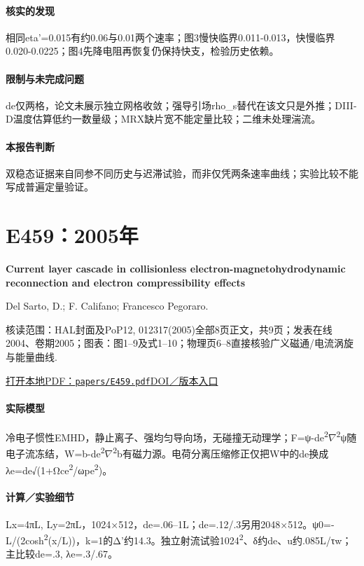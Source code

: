 \paragraph{核实的发现}相同eta'=0.015有约0.06与0.01两个速率；图3慢快临界0.011-0.013，快慢临界0.020-0.0225；图4先降电阻再恢复仍保持快支，检验历史依赖。

\paragraph{限制与未完成问题}de仅两格，论文未展示独立网格收敛；强导引场rho\_s替代在该文只是外推；DIII-D温度估算低约一数量级；MRX缺片宽不能定量比较；二维未处理湍流。

\paragraph{本报告判断}双稳态证据来自同参不同历史与迟滞试验，而非仅凭两条速率曲线；实验比较不能写成普遍定量验证。

\section{E459：2005年}\label{paper:E459}

\textbf{Current layer cascade in collisionless electron-magnetohydrodynamic reconnection and electron compressibility effects}\citep{E459}\

Del Sarto,  D.;  F. Califano;  Francesco Pegoraro.

\textsf{核读范围：}HAL封面及PoP12, 012317(2005)全部8页正文，共9页；发表在线2004、卷期2005；\textsf{图表：}图1–9及式1–10；物理页6–8直接核验广义磁通/电流涡旋与能量曲线.

\href{run:papers/E459.pdf}{打开本地PDF：\texttt{papers/E459.pdf}}\quad\href{https://doi.org/10.1063/1.1829064}{DOI／版本入口}

\paragraph{实际模型}冷电子惯性EMHD，静止离子、强均匀导向场，无碰撞无动理学；F=ψ-de\textsuperscript{2}\ensuremath{\nabla}\textsuperscript{2}ψ随电子流冻结，W=b-de\textsuperscript{2}\ensuremath{\nabla}\textsuperscript{2}b有磁力源。电荷分离压缩修正仅把W中的de换成λe=de√(1+Ωce\textsuperscript{2}/ωpe\textsuperscript{2})。

\paragraph{计算／实验细节}Lx=4πL, Ly=2πL，1024×512，de=.06–1L；de=.12/.3另用2048×512。ψ0=-L/(2cosh\textsuperscript{2}(x/L))，k=1的Δ'约14.3。独立射流试验1024\textsuperscript{2}、δ约de、u约.085L/τw；主比较de=.3, λe=.3/.67。


